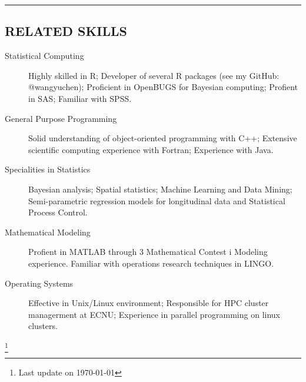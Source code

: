 \documentclass[11pt]{article}
\begin{document}
\vspace{0.2em}
\hrule
\vspace{-1em}

\vspace{-1em}
\subsection*{\centering RELATED SKILLS}
\vspace{-.6em}

\begin{description}
	\item[Statistical Computing] Highly skilled in R; Developer of several R packages (see my GitHub: @wangyuchen); Proficient in OpenBUGS for Bayesian computing; Profient in SAS; Familiar with SPSS.
	\item[General Purpose Programming] Solid understanding of object-oriented programming with C++; Extensive scientific computing experience with Fortran; Experience with Java.
	\item[Specialities in Statistics] Bayesian analysis; Spatial statistics; Machine Learning and Data Mining; Semi-parametric regression models for longitudinal data and Statistical Process Control.
	\item[Mathematical Modeling] Profient in MATLAB through 3 Mathematical Contest i Modeling experience. Familiar with operations research techniques in LINGO.
	\item[Operating Systems] Effective in Unix/Linux environment; Responsible for HPC cluster managerment at ECNU; Experience in parallel programming on linux clusters.
\end{description}

\let\thefootnote\relax\footnote{Last update on \today}
\end{document}
